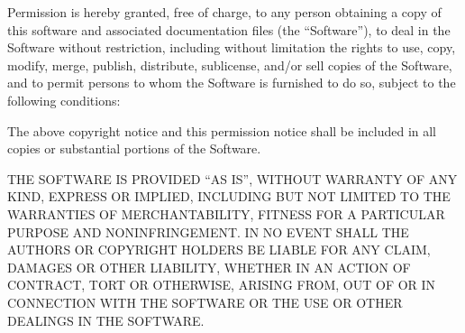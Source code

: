 \documentclass[11pt]{padajar-memo}
\begin{document}
Permission is hereby granted, free of charge, to any person obtaining a copy of this software and associated documentation files (the “Software”), to deal in the Software without restriction, including without limitation the rights to use, copy, modify, merge, publish, distribute, sublicense, and/or sell copies of the Software, and to permit persons to whom the Software is furnished to do so, subject to the following conditions:

The above copyright notice and this permission notice shall be included in all copies or substantial portions of the Software.

THE SOFTWARE IS PROVIDED “AS IS”, WITHOUT WARRANTY OF ANY KIND, EXPRESS OR IMPLIED, INCLUDING BUT NOT LIMITED TO THE WARRANTIES OF MERCHANTABILITY, FITNESS FOR A PARTICULAR PURPOSE AND NONINFRINGEMENT. IN NO EVENT SHALL THE AUTHORS OR COPYRIGHT HOLDERS BE LIABLE FOR ANY CLAIM, DAMAGES OR OTHER LIABILITY, WHETHER IN AN ACTION OF CONTRACT, TORT OR OTHERWISE, ARISING FROM, OUT OF OR IN CONNECTION WITH THE SOFTWARE OR THE USE OR OTHER DEALINGS IN THE SOFTWARE.
\end{document}
